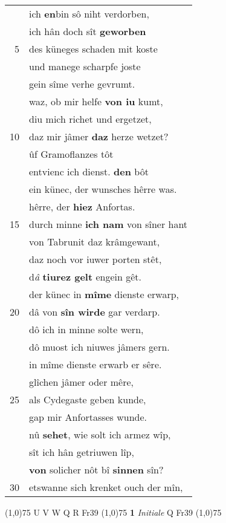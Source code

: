 \documentclass[8pt,a4paper,notitlepage]{article}
\begin{document}
\begin{table}[ht]
\begin{minipage}[t]{0.5\linewidth}
\begin{tabular}{rl}
 & ich \textbf{en}bin sô niht verdorben,\\ 
 & ich hân doch sît \textbf{geworben}\\ 
5 & des küneges schaden mit koste\\ 
 & und manege scharpfe joste\\ 
 & gein sîme verhe gevrumt.\\ 
 & waz, ob mir helfe \textbf{von iu} kumt,\\ 
 & diu mich richet und ergetzet,\\ 
10 & daz mir jâmer \textbf{daz} herze wetzet?\\ 
 & ûf Gramoflanzes tôt\\ 
 & entvienc ich dienst. \textbf{den} bôt\\ 
 & ein künec, der wunsches hêrre was.\\ 
 & hêrre, der \textbf{hiez} Anfortas.\\ 
15 & durch minne \textbf{ich nam} von sîner hant\\ 
 & von Tabrunit daz krâmgewant,\\ 
 & daz noch vor iuwer porten stêt,\\ 
 & d\textit{â} \textbf{tiurez gelt} engein gêt.\\ 
 & der künec in \textbf{mîme} dienste erwarp,\\ 
20 & dâ von \textbf{sîn wirde} gar verdarp.\\ 
 & dô ich in minne solte wern,\\ 
 & dô muost ich niuwes jâmers gern.\\ 
 & in mîme dienste erwarb er sêre.\\ 
 & glîchen jâmer oder mêre,\\ 
25 & als Cydegaste geben kunde,\\ 
 & gap mir Anfortasses wunde.\\ 
 & nû \textbf{sehet}, wie solt ich armez wîp,\\ 
 & sît ich hân getriuwen lîp,\\ 
 & \textbf{von} solicher nôt bî \textbf{sinnen} sîn?\\ 
30 & etswanne sich krenket ouch der mîn,\\ 
\end{tabular}
\scriptsize
\line(1,0){75} \newline
U V W Q R Fr39 \newline
\line(1,0){75} \newline
\textbf{1} \textit{Initiale} Q Fr39  \newline
\line(1,0){75} \newline

\end{minipage}
\end{table}
\end{document}

